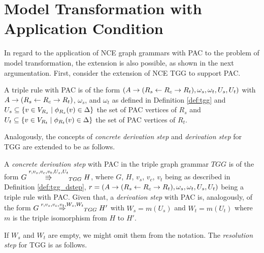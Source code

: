 \section{Model Transformation with Application Condition}
In regard to the application of NCE graph grammars with PAC to the problem of model transformation, the extension is also possible, as shown in the next argumentation. First, consider the extension of NCE TGG to support PAC. 

\begin{definition}
	A triple rule with PAC is of the form $(A \to (R_s \overset{}{\leftarrow} R_c \overset{}{\rightarrow} R_t), \omega_s, \omega_t, U_s, U_t)$ with $A \to (R_s \overset{}{\leftarrow} R_c \overset{}{\rightarrow} R_t)$, $\omega_s$, and $\omega_t$ as defined in Definition \ref{def:tgg} and $U_s \subseteq \{v \in V_{R_s} \; | \; \phi_{R_s}(v) \in \Delta\}$ the set of PAC vertices of $R_s$ and $U_t \subseteq \{v \in V_{R_t} \; | \; \phi_{R_t}(v) \in \Delta\}$ the set of PAC vertices of $R_t$.
\end{definition}

Analogously, the concepts of \textit{concrete derivation step} and \textit{derivation step} for TGG are extended to be as follows.

\begin{definition}
 A \textit{concrete derivation step} with PAC in the triple graph grammar $TGG$ is of the form $G \overset{r,v_s,v_c,v_t,U_s,U_t}{\Rrightarrow}_{TGG} H$, where $G$, $H$, $v_s$, $v_c$, $v_t$ being as described in Definition \ref{def:tgg_dstep}, $r = (A \to (R_s \overset{}{\leftarrow} R_c \overset{}{\rightarrow} R_t), \omega_s, \omega_t, U_s, U_t)$ being a triple rule with PAC. Given that, a \textit{derivation step} with PAC is, analogously, of the form $G \tderivpac{r}{v_s,v_c,v_t}{W_s,W_t}{TGG} H'$ with $W_s = m(U_s)$ and $W_t = m(U_t)$ where $m$ is the triple isomorphism from $H$ to $H'$.
\end{definition}

If $W_s$ and $W_t$ are empty, we might omit them from the notation. The \textit{resolution step} for TGG is as follows.

